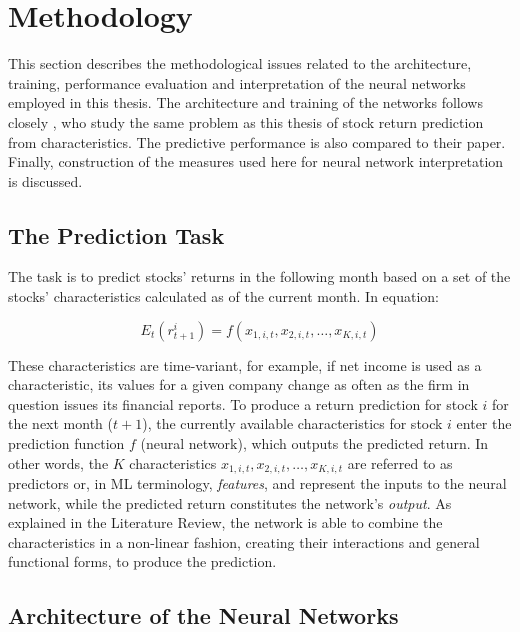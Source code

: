 	


\section{Methodology}

	This  section describes the methodological issues related to the architecture, training, performance evaluation and interpretation of the neural networks employed in this thesis. The architecture and training of the networks follows closely \cite{gu2020empirical}, who study the same problem as this thesis of stock return prediction from characteristics. The predictive performance is also compared to their paper. Finally, construction of the measures used here for neural network interpretation is discussed. 
	
	\subsection{The Prediction Task}
	
		The task is to predict stocks' returns in the following month based on a set of the stocks' characteristics calculated as of the current month. In equation:
		
		\begin{equation}
			E_t(r^i_{t+1}) = f(x_{1,i,t}, x_{2,i,t}, \ldots, x_{K,i,t})		
		\end{equation}
		
		These characteristics are time-variant, for example, if net income is used as a characteristic, its values for a given company change as often as the firm in question issues its financial reports. To produce a return prediction for stock $i$ for the next month ($t+1$), the currently available characteristics for stock $i$ enter the prediction function $f$ (neural network), which outputs the predicted return. In other words, the $K$ characteristics $x_{1,i,t}, x_{2,i,t}, \ldots, x_{K,i,t}$ are referred to as predictors or, in ML terminology, \textit{features}, and represent the inputs to the neural network, while the predicted return constitutes the network's \textit{output}. As explained in the Literature Review, the network is able to combine the characteristics in a non-linear fashion, creating their interactions and general functional forms, to produce the prediction.
	
	\subsection{Architecture of the Neural Networks}
		\label{chap:architecture}
	
